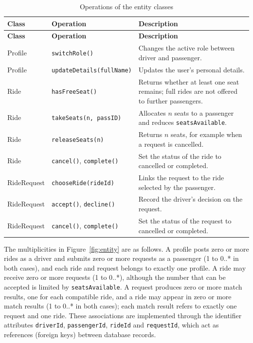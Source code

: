 {\begin{longtable}{@{}>{\raggedright\arraybackslash}p{}
                   >{\raggedright\arraybackslash}p{}
                   >{\raggedright\arraybackslash}p{}@{}}
\caption{Operations of the entity classes}\label{tab:entityops}\\
\toprule
\textbf{Class} & \textbf{Operation} & \textbf{Description} \\
\midrule
\endfirsthead
\toprule
\textbf{Class} & \textbf{Operation} & \textbf{Description} \\
\midrule
\endhead
\bottomrule
\endfoot
Profile & \texttt{switchRole()} & Changes the active role between driver and passenger. \\
Profile & \texttt{updateDetails(fullName)} & Updates the user's personal details. \\
Ride & \texttt{hasFreeSeat()} & Returns whether at least one seat remains; full rides are not offered to further passengers. \\
Ride & \texttt{takeSeats(n, passID)} & Allocates $n$ seats to a passenger and reduces \texttt{seatsAvailable}. \\
Ride & \texttt{releaseSeats(n)} & Returns $n$ seats, for example when a request is cancelled. \\
Ride & \texttt{cancel()}, \texttt{complete()} & Set the status of the ride to cancelled or completed. \\
RideRequest & \texttt{chooseRide(rideId)} & Links the request to the ride selected by the passenger. \\
RideRequest & \texttt{accept()}, \texttt{decline()} & Record the driver's decision on the request. \\
RideRequest & \texttt{cancel()}, \texttt{complete()} & Set the status of the request to cancelled or completed. \\
\end{longtable}

The multiplicities in Figure~\ref{fig:entity} are as follows. A profile posts zero or more rides as a driver and submits zero or more requests as a passenger (1 to 0..* in both cases), and each ride and request belongs to exactly one profile. A ride may receive zero or more requests (1 to 0..*), although the number that can be accepted is limited by \texttt{seatsAvailable}. A request produces zero or more match results, one for each compatible ride, and a ride may appear in zero or more match results (1 to 0..* in both cases); each match result refers to exactly one request and one ride. These associations are implemented through the identifier attributes \texttt{driverId}, \texttt{passengerId}, \texttt{rideId} and \texttt{requestId}, which act as references (foreign keys) between database records.

}
